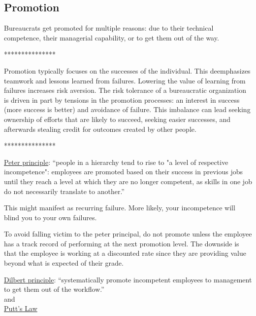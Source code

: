 \subsection{Promotion\label{sec:promotion}}

Bureaucrats get promoted for multiple reasons: due to their technical competence, their managerial capability, or to get them out of the way.

***************

Promotion typically focuses on the successes of the individual. This deemphasizes teamwork and lessons learned from failures. Lowering the value of learning from failures increases risk aversion. The risk tolerance of a bureaucratic organization is driven in part by tensions in the promotion processes: an interest in success (more success is better) and avoidance of failure. This imbalance can lead seeking ownership of efforts that are likely to succeed, seeking easier successes, and afterwards stealing credit for outcomes created by other people. 

***************

\href{https://en.wikipedia.org/wiki/Peter_principle}{Peter principle}: ``people in a hierarchy tend to rise to "a level of respective incompetence": employees are promoted based on their success in previous jobs until they reach a level at which they are no longer competent, as skills in one job do not necessarily translate to another.''

This might manifest as recurring failure. More likely, your incompetence will blind you to your own failures.

To avoid falling victim to the peter principal, do not promote unless the employee has a track record of performing at the next promotion level. The downside is that the employee is working at a discounted rate since they are providing value beyond what is expected of their grade.


\href{https://en.wikipedia.org/wiki/Dilbert_principle}{Dilbert principle}: ``systematically promote incompetent employees to management to get them out of the workflow.''\\
and\\
\href{https://en.wikipedia.org/wiki/Putt\%27s_Law_and_the_Successful_Technocrat}{Putt's Law}





